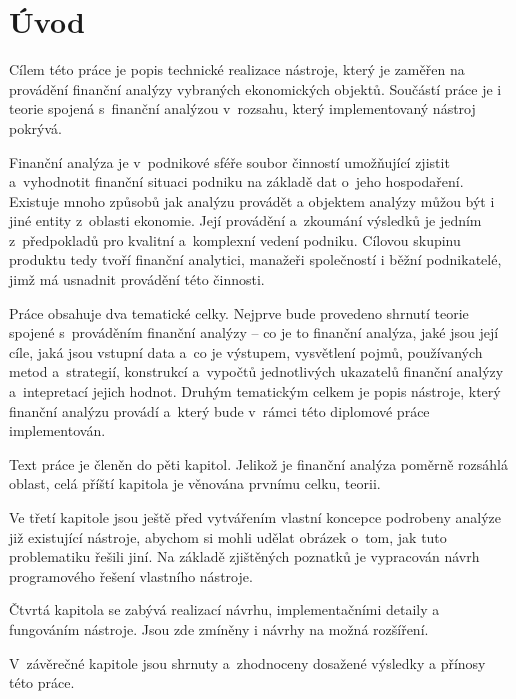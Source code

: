 \chapter{Úvod}
Cílem této práce je popis technické realizace nástroje, který je zaměřen na provádění finanční analýzy vybraných ekonomických objektů. Součástí práce je i teorie spojená s~finanční analýzou v~rozsahu, který implementovaný nástroj pokrývá.

Finanční analýza je v~podnikové sféře soubor činností umožňující zjistit a~vyhodnotit finanční situaci podniku na základě dat o~jeho hospodaření. Existuje mnoho způsobů jak analýzu provádět a objektem analýzy můžou být i jiné entity z~oblasti ekonomie. Její provádění a~zkoumání výsledků je jedním z~předpokladů pro kvalitní a~komplexní vedení podniku. Cílovou skupinu produktu tedy tvoří finanční analytici, manažeři společností i běžní podnikatelé, jimž má usnadnit provádění této činnosti.

Práce obsahuje dva tematické celky. Nejprve bude provedeno shrnutí teorie spojené s~prováděním finanční analýzy -- co je to finanční analýza, jaké jsou její cíle, jaká jsou vstupní data a~co je výstupem, vysvětlení pojmů, používaných metod a~strategií, konstrukcí a~vypočtů jednotlivých ukazatelů finanční analýzy a~intepretací jejich hodnot. Druhým tematickým celkem je popis nástroje, který finanční analýzu provádí a~který bude v~rámci této diplomové práce implementován. 

Text práce je členěn do pěti kapitol. Jelikož je finanční analýza poměrně rozsáhlá oblast, celá příští kapitola je věnována prvnímu celku, teorii. 

Ve třetí kapitole jsou ještě před vytvářením vlastní koncepce podrobeny analýze již existující nástroje, abychom si mohli udělat obrázek o~tom, jak tuto problematiku řešili jiní. Na základě zjištěných poznatků je vypracován návrh programového řešení vlastního nástroje.

Čtvrtá kapitola se zabývá realizací návrhu, implementačními detaily a fungováním nástroje. Jsou zde zmíněny i návrhy na možná rozšíření.

V~závěrečné kapitole jsou shrnuty a~zhodnoceny dosažené výsledky a přínosy této práce.





























